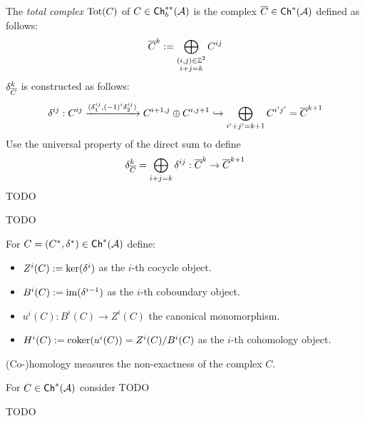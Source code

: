\documentclass[a4paper]{report}
\begin{document}
\begin{defi}
  The \emph{total complex} $\operatorname{Tot}(C)$ of $C \in \mathsf{Ch}^{**}_{b}(\mathcal{A})$ is the complex $\overline C \in \mathsf{Ch}^*(\mathcal{A})$ defined as follows:
  \[\overline C^{k} := \bigoplus_{\substack{(i,j) \in \mathbb{Z}^{2} \\ i+j = k}}C^{ij}\]
  $\delta_{\overline C}^{k}$ is constructed as follows:
  \[\delta^{ij}: C^{ij} \xrightarrow{(\delta_{1}^{ij}, (-1)^{i}\delta_{2}^{ij})} C^{i+1, j} \oplus C^{i, j+1} \hookrightarrow \bigoplus_{i'+j' = k+1} C^{i'j'} = \overline C^{k+1}\]
  Use the universal property of the direct sum to define
  \[\delta_{\overline C}^{k} = \bigoplus_{i+j=k}\delta^{ij}: \overline C^{k}\to \overline C^{k+1}\]
  TODO
\end{defi}
\begin{exer}
TODO
\end{exer}
\begin{defi}
  For $C = (C^{*}, \delta^{*}) \in \mathsf{Ch}^*(\mathcal{A})$ define:
  \begin{itemize}
\item $Z^{i}(C) := \ker(\delta^{i})$ as the $i$-th cocycle object.
    \item $B^{i}(C) := \operatorname{im}(\delta^{i-1})$ as the $i$-th coboundary object.
    \item $u^{i}(C): B^{i}(C) \to Z^{i}(C)$ the canonical monomorphism.
    \item $H^{i}(C) := \cok(u^{i}(C)) = \fak {Z^{i}(C)}{B^{i}(C)}$ as the $i$-th cohomology object.
  \end{itemize}
  (Co-)homology measures the non-exactness of the complex $C$.
\end{defi}

\begin{lemm}
  For $C \in \mathsf{Ch}^*(\mathcal{A})$ consider TODO
\end{lemm}

\begin{lemm}[exer]
TODO
\end{lemm}
\end{document}
